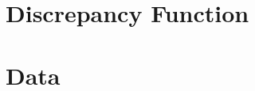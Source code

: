 \documentclass{article}
\begin{document}
\section{Discrepancy Function}

\section{Data}



\end{document}
